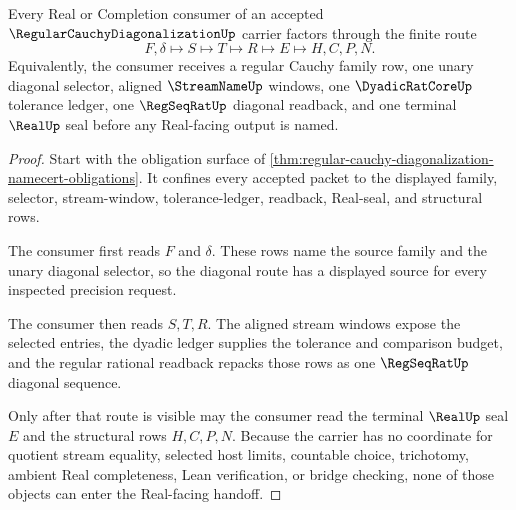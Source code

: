 \begin{theorem}
\label{thm:regular-cauchy-diagonalization-real-seal-handoff}
Every Real or Completion consumer of an accepted $\RegularCauchyDiagonalizationUp$ carrier factors through the finite route
$$
F,\delta \longmapsto S \longmapsto T \longmapsto R \longmapsto E \longmapsto H,C,P,N .
$$
Equivalently, the consumer receives a regular Cauchy family row, one unary diagonal selector, aligned $\StreamNameUp$ windows, one $\DyadicRatCoreUp$ tolerance ledger, one $\RegSeqRatUp$ diagonal readback, and one terminal $\RealUp$ seal before any Real-facing output is named.
\end{theorem}
\begin{proof}
Start with the obligation surface of \autoref{thm:regular-cauchy-diagonalization-namecert-obligations}. It confines every accepted packet to the displayed family, selector, stream-window, tolerance-ledger, readback, Real-seal, and structural rows.

The consumer first reads $F$ and $\delta$. These rows name the source family and the unary diagonal selector, so the diagonal route has a displayed source for every inspected precision request.

The consumer then reads $S,T,R$. The aligned stream windows expose the selected entries, the dyadic ledger supplies the tolerance and comparison budget, and the regular rational readback repacks those rows as one $\RegSeqRatUp$ diagonal sequence.

Only after that route is visible may the consumer read the terminal $\RealUp$ seal $E$ and the structural rows $H,C,P,N$. Because the carrier has no coordinate for quotient stream equality, selected host limits, countable choice, trichotomy, ambient Real completeness, Lean verification, or bridge checking, none of those objects can enter the Real-facing handoff.
\end{proof}

